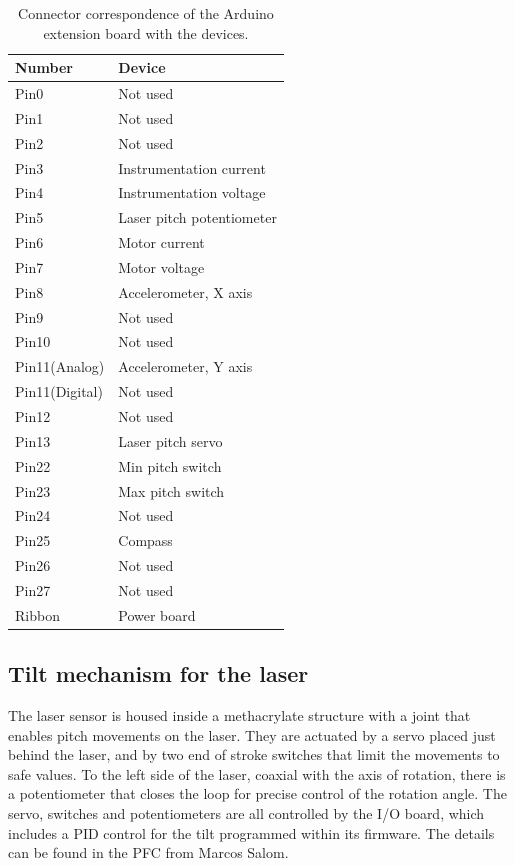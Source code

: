 \begin{table}
  \centering
  \begin{tabular}{|l|l|} \hline
    \textbf{Number} & \textbf{Device}\\ \hline \hline
    Pin0  & Not used \\ \hline
    Pin1  & Not used \\ \hline
    Pin2  & Not used \\ \hline
    Pin3  & Instrumentation current \\ \hline
    Pin4  & Instrumentation voltage \\ \hline
    Pin5  & Laser pitch potentiometer \\ \hline
    Pin6  & Motor current \\ \hline
    Pin7  & Motor voltage \\ \hline
    Pin8  & Accelerometer, X axis \\ \hline
    Pin9  & Not used \\ \hline
    Pin10 & Not used \\ \hline
    Pin11(Analog) & Accelerometer, Y axis \\ \hline
    Pin11(Digital) & Not used \\ \hline
    Pin12 & Not used \\ \hline
    Pin13 & Laser pitch servo \\ \hline
    Pin22 & Min pitch switch \\ \hline
    Pin23 & Max pitch switch \\ \hline
    Pin24 & Not used \\ \hline
    Pin25 & Compass \\ \hline
    Pin26 & Not used \\ \hline
    Pin27 & Not used \\ \hline
    Ribbon & Power board \\ \hline
  \end{tabular}
  \caption{Connector correspondence of the Arduino extension board with the
  devices.}
  \label{tab:ModulesArduinoExtensionPins}
\end{table}

\subsection{Tilt mechanism for the laser}
The laser sensor is housed inside a methacrylate structure with a joint that enables pitch movements on the laser. They are actuated by a servo placed just behind the laser, and by two end of stroke switches that limit the movements to safe values. To the left side of the laser, coaxial with the axis of rotation, there is a potentiometer that closes the loop for precise control of the rotation angle. The servo, switches and potentiometers are all controlled by the I/O board, which includes a PID control for the tilt programmed within its firmware. The details can be found in the PFC from Marcos Salom. %

